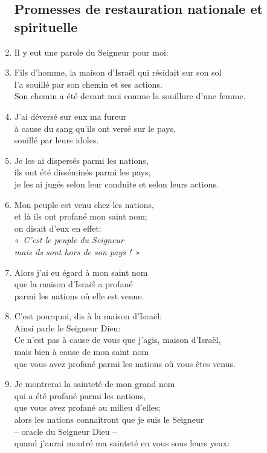 \begin{enumerate}[leftmargin=\psleftmargin, labelsep = \pslabelsep, label={\arabic*}, font=\color{\pscolor}\small\textsuperscript, parsep=0em, itemsep=0em, topsep=0em ]
          \subsection*{Promesses de restauration nationale et spirituelle}
    \item Il y eut une parole du Seigneur pour moi:
    \item Fils d’homme, la maison d’Israël qui résidait sur son sol \\ l’a souillé par son chemin et ses actions. \\ Son chemin a été devant moi comme la souillure d’une femme.
    \item J’ai déversé sur eux ma fureur \\ à cause du sang qu’ils ont versé sur le pays, \\ souillé par leurs idoles.
    \item Je les ai dispersés parmi les nations, \\ ils ont été disséminés parmi les pays, \\ je les ai jugés selon leur conduite et selon leurs actions.
    \item Mon peuple est venu chez les nations, \\ et là ils ont profané mon saint nom; \\ on disait d’eux en effet: \\ \decalage «~\textit{C’est le peuple du Seigneur \\ \decalage mais ils sont hors de son pays !}~»
    \item Alors j’ai eu égard à mon saint nom \\ que la maison d’Israël a profané \\ parmi les nations où elle est venue. \parSpace
    \item C’est pourquoi, dis à la maison d’Israël: \\ Ainsi parle le Seigneur Dieu: \\ Ce n’est pas à cause de vous que j’agis, maison d’Israël, \\ mais bien à cause de mon saint nom \\ que vous avez profané parmi les nations où vous êtes venus.
    \item Je montrerai la sainteté de mon grand nom \\ qui a été profané parmi les nations, \\ que vous avez profané au milieu d’elles; \\
    alors les nations connaîtront que je suis le Seigneur \\ – oracle du Seigneur Dieu – \\ quand j’aurai montré ma sainteté en vous sous leurs yeux:

\end{enumerate}
